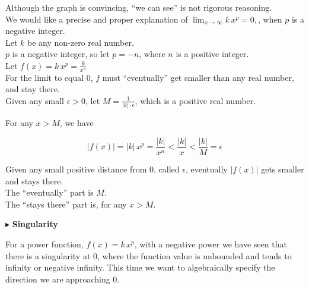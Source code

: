 \documentclass{ximera}
\begin{document}
\begin{notation}


Although the graph is convincing, ``we can see'' is not rigorous reasoning. \\


We would like a precise and proper explanation of $\lim_{x \to \infty} k \, x^p = 0,  $, when $p$ is a negative integer. \\


Let $k$ be any non-zero real number. \\
$p$ is a negative integer, so let $p = -n$, where $n$ is a positive integer. \\
Let $f(x) = k \, x^p = \frac{k}{x^n}$ \\



For the limit to equal $0$, $f$ must ``eventually'' get smaller than any real number, and stay there. \\



Given any small $\epsilon > 0$, let $M = \frac{1}{| k | \cdot \epsilon}$, which is a positive real number.


For any $x > M$, we have 

\[
| f(x) | = | k | \, x^p  = \frac{| k |}{x^n} < \frac{| k |}{x} < \frac{| k |}{M}  = \epsilon
\] 


Given any small positive distance from $0$, called $\epsilon$, eventually $| f(x) |$ gets smaller and stays there. \\



The ``eventually'' part is $M$. \\

The ``stays there'' part is, for any $x > M$.


\end{notation}
















$\blacktriangleright$  \textbf{Singularity}



For a power function, $f(x) = k \, x^p$, with a negative power we have seen that there is a singularity at $0$, where the function value is unbounded and tends to infinity or negative infinity.  This time we want to algebraically specify the direction we are approaching $0$.  
\end{document}
